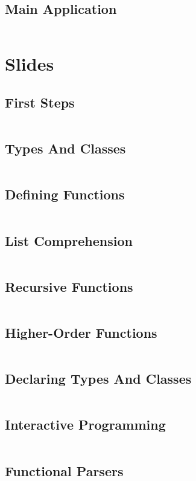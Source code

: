 \documentclass[a4paper,9pt,twoside]{book}
\newcommand{\hsfile}[1]{\inputminted[breaklines]{haskell}{../haskell/#1.hs}}
\begin{document}
\section{Main Application}
\hsfile{vcg/Main}

\chapter{Slides}
\section{First Steps}
\hsfile{slides/1_first_steps}
\section{Types And Classes}
\hsfile{slides/2_types_and_classes}
\section{Defining Functions}
\hsfile{slides/3_defining_functions}
\section{List Comprehension}
\hsfile{slides/4_list_comprehension}
\section{Recursive Functions}
\hsfile{slides/5_recursive_functions}
\section{Higher-Order Functions}
\hsfile{slides/6_higher-order_functions}
\section{Declaring Types And Classes}
\hsfile{slides/7_declaring_types_and_classes}
\section{Interactive Programming}
\hsfile{slides/8_interactive_programming}
\section{Functional Parsers}
\hsfile{slides/9_functional_parsers}
\end{document}
